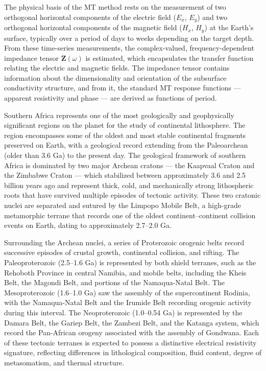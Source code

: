 The physical basis of the MT method rests on the measurement of two orthogonal horizontal components of the electric field ($E_x$, $E_y$) and two orthogonal horizontal components of the magnetic field ($H_x$, $H_y$) at the Earth's surface, typically over a period of days to weeks depending on the target depth. From these time-series measurements, the complex-valued, frequency-dependent impedance tensor $\mathbf{Z}(\omega)$ is estimated, which encapsulates the transfer function relating the electric and magnetic fields. The impedance tensor contains information about the dimensionality and orientation of the subsurface conductivity structure, and from it, the standard MT response functions --- apparent resistivity and phase --- are derived as functions of period.

Southern Africa represents one of the most geologically and geophysically significant regions on the planet for the study of continental lithosphere. The region encompasses some of the oldest and most stable continental fragments preserved on Earth, with a geological record extending from the Paleoarchean (older than 3.6 Ga) to the present day. The geological framework of southern Africa is dominated by two major Archean cratons --- the Kaapvaal Craton and the Zimbabwe Craton --- which stabilized between approximately 3.6 and 2.5 billion years ago and represent thick, cold, and mechanically strong lithospheric roots that have survived multiple episodes of tectonic activity. These two cratonic nuclei are separated and sutured by the Limpopo Mobile Belt, a high-grade metamorphic terrane that records one of the oldest continent--continent collision events on Earth, dating to approximately 2.7--2.0 Ga.

Surrounding the Archean nuclei, a series of Proterozoic orogenic belts record successive episodes of crustal growth, continental collision, and rifting. The Paleoproterozoic (2.5--1.6 Ga) is represented by both shield terranes, such as the Rehoboth Province in central Namibia, and mobile belts, including the Kheis Belt, the Magondi Belt, and portions of the Namaqua-Natal Belt. The Mesoproterozoic (1.6--1.0 Ga) saw the assembly of the supercontinent Rodinia, with the Namaqua-Natal Belt and the Irumide Belt recording orogenic activity during this interval. The Neoproterozoic (1.0--0.54 Ga) is represented by the Damara Belt, the Gariep Belt, the Zambezi Belt, and the Katanga system, which record the Pan-African orogeny associated with the assembly of Gondwana. Each of these tectonic terranes is expected to possess a distinctive electrical resistivity signature, reflecting differences in lithological composition, fluid content, degree of metasomatism, and thermal structure.

